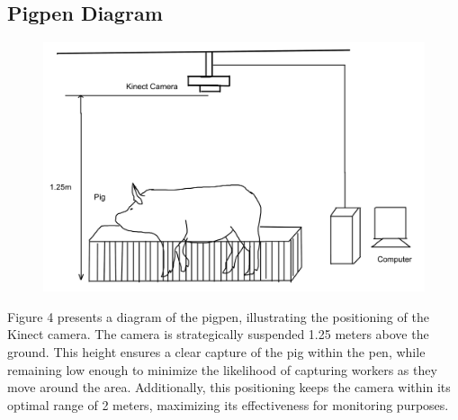 {\subsection {Pigpen Diagram}

\begin{figure}[h]
	\centering
	\includegraphics[height=0.4\textheight]{figures/Untitled-1wqw}
	\caption{}
	\label{fig:Pigpen Diagram}
\end{figure}

Figure 4 presents a diagram of the pigpen, illustrating the positioning of the Kinect camera. The camera is strategically suspended 1.25 meters above the ground. This height ensures a clear capture of the pig within the pen, while remaining low enough to minimize the likelihood of capturing workers as they move around the area. Additionally, this positioning keeps the camera within its optimal range of 2 meters, maximizing its effectiveness for monitoring purposes.

}
